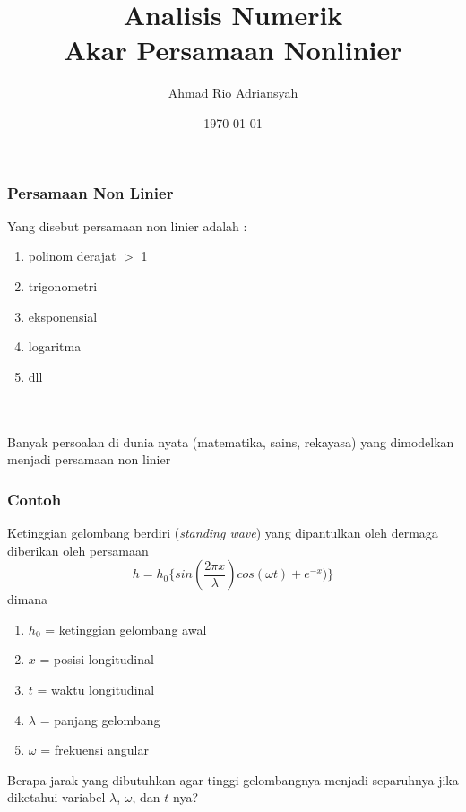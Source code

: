 \documentclass{beamer}
\title[Anum - Akar Pers. Nonlinier]{Analisis Numerik\\Akar Persamaan Nonlinier} %
\author{Ahmad Rio Adriansyah} %
\institute[STT-NF] %
{
STT Terpadu - Nurul Fikri \\ %
\medskip
\textit{ahmad.rio.adriansyah@gmail.com
\\arasy@nurulfikri.ac.id} %
}
\date{\today} %
\begin{document}
\begin{frame}
\titlepage %
\end{frame}



\begin{frame}
\frametitle{Persamaan Non Linier}
Yang disebut persamaan non linier adalah :
\begin{enumerate}
\item polinom derajat $>$ 1
\item trigonometri
\item eksponensial
\item logaritma
\item dll
\end{enumerate}
\ \\\ \\Banyak persoalan di dunia nyata (matematika, sains, rekayasa) yang dimodelkan menjadi persamaan non linier
\end{frame}


\begin{frame}
\frametitle{Contoh}
Ketinggian gelombang berdiri (\textit{standing wave}) yang dipantulkan oleh dermaga diberikan oleh persamaan 
\begin{equation}
h = h_0 \biggl\{sin(\dfrac{2\pi x}{\lambda})cos(\omega t)+ e^{-x})\biggr\}
\nonumber
\end{equation}
dimana 
\begin{enumerate}
\item $h_0$ = ketinggian gelombang awal
\item $x$ = posisi longitudinal
\item $t$ = waktu longitudinal
\item $\lambda$ = panjang gelombang
\item $\omega$ = frekuensi angular
\end{enumerate}
Berapa jarak yang dibutuhkan agar tinggi gelombangnya menjadi separuhnya jika diketahui variabel $\lambda$, $\omega$, dan $t$ nya?
\end{frame}

\end{document}
